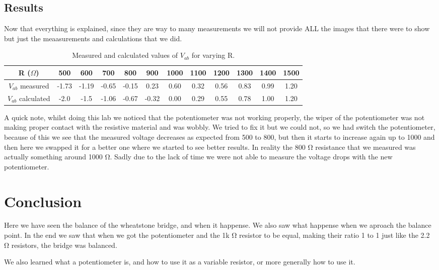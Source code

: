 \documentclass[a4paper, 10pt]{article}
\begin{document}
		\subsection{Results}
			Now that everything is explained, since they are way to many measurements we will not provide ALL the images
			that there were to show but just the meaasurements and calculations that we did.

			\begin{table}[ht]
				\centering
				\begin{tabular}{|c|c|c|c|c|c|c|c|c|c|c|c|}
					\hline
					R ($\Omega$) & 500 & 600 & 700 & 800 & 900 & 1000 & 1100 & 1200 & 1300 & 1400 & 1500 \\ \hline
					$V_{ab}$ measured & -1.73 & -1.19 & -0.65 & -0.15 & 0.23 & 0.60 & 0.32 & 0.56 & 0.83 & 0.99 & 1.20 \\ \hline
					$V_{ab}$ calculated & -2.0 & -1.5 & -1.06 & -0.67 & -0.32 & 0.00 & 0.29 & 0.55 & 0.78 & 1.00 & 1.20 \\ \hline
				\end{tabular}
				\caption{Measured and calculated values of $V_{ab}$ for varying R.}
				\label{tab:my_label}
			\end{table}

			A quick note, whilst doing this lab we noticed that the potentiometer was not working properly, 
			the wiper of the potentiometer was not making proper contact with the resistive material and was wobbly.
			We tried to fix it but we could not, so we had switch the potentiometer, because of this we see that
			the measured voltage decreases as expected from 500 to 800, but then it starts to increase again
			up to 1000 and then here we swapped it for a better one where we started to see better results.
			In reality the 800 \si{\ohm} resistance that we measured was actually something around 1000 \si{\ohm}.
			Sadly due to the lack of time we were not able to measure the voltage drops with the new potentiometer.

	\pagebreak
	\section{Conclusion}
			Here we have seen the balance of the wheatstone bridge, and when it happense.
			We also saw what happense when we aproach the balance point.
			In the end we saw that when we got the potentiometer and the 1k \si{\ohm} resistor to be equal,
			making their ratio 1 to 1 just like the 2.2 \si{\ohm} resistors, the bridge was balanced.

			\vspace{5mm}

			We also learned what a potentiometer is, and how to use it as a variable resistor, or more generally how
			to use it.
\end{document}

